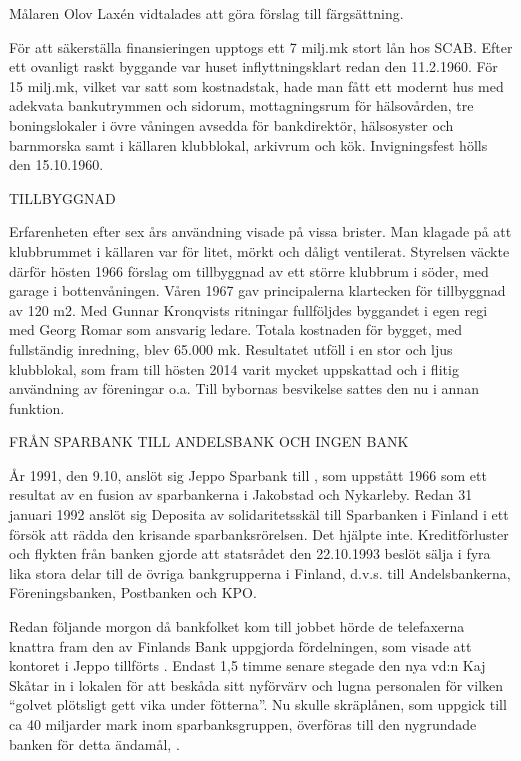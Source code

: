 Målaren Olov Laxén vidtalades att göra förslag till färgsättning.

För att säkerställa finansieringen upptogs ett 7 milj.mk stort lån hos SCAB. Efter ett ovanligt raskt byggande var huset inflyttningsklart redan den 11.2.1960. För 15 milj.mk, vilket var satt som kostnadstak, hade man fått ett modernt hus med adekvata bankutrymmen och sidorum, mottagningsrum för hälsovården, tre boningslokaler i övre våningen avsedda för bankdirektör, hälsosyster och barnmorska samt i källaren klubblokal, arkivrum och kök. Invigningsfest hölls den 15.10.1960.



TILLBYGGNAD

Erfarenheten efter sex års användning visade på vissa brister. Man klagade på att klubbrummet i källaren var för litet, mörkt och dåligt ventilerat. Styrelsen väckte därför hösten 1966 förslag om tillbyggnad av ett större klubbrum i söder, med garage i bottenvåningen. Våren 1967 gav principalerna klartecken för tillbyggnad av 120 m2. Med Gunnar Kronqvists ritningar fullföljdes byggandet i egen regi med Georg Romar som ansvarig ledare. Totala kostnaden för bygget, med fullständig inredning, blev 65.000 mk. Resultatet utföll i en stor och ljus klubblokal, som fram till hösten 2014 varit mycket uppskattad och i flitig användning av föreningar o.a. Till bybornas besvikelse sattes den nu i annan funktion.


FRÅN SPARBANK TILL ANDELSBANK OCH INGEN BANK

År 1991, den 9.10, anslöt sig Jeppo Sparbank till , som uppstått 1966 som ett resultat av en fusion av sparbankerna i Jakobstad och Nykarleby. Redan 31 januari 1992 anslöt sig Deposita av solidaritetsskäl till Sparbanken i Finland i ett försök att rädda den krisande sparbanksrörelsen. Det hjälpte inte. Kreditförluster och flykten från banken gjorde att statsrådet den 22.10.1993 beslöt sälja  i fyra lika stora delar till de övriga bankgrupperna i Finland, d.v.s. till Andelsbankerna, Föreningsbanken, Postbanken och KPO.

Redan följande morgon då bankfolket kom till jobbet hörde de telefaxerna knattra fram den av Finlands Bank uppgjorda fördelningen, som visade att kontoret i Jeppo tillförts . Endast 1,5 timme senare stegade den nya vd:n Kaj Skåtar in i lokalen för att beskåda sitt nyförvärv och lugna personalen för vilken ``golvet plötsligt gett vika under fötterna''. Nu skulle skräplånen, som uppgick till ca 40 miljarder mark inom sparbanksgruppen, överföras till den nygrundade banken för detta ändamål, .


